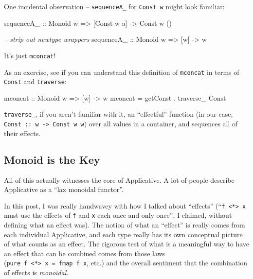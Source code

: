 \documentclass[]{article}
\newenvironment{Shaded}{}{}
\newcommand{\CommentTok}[1]{\textcolor[rgb]{0.38,0.63,0.69}{\textit{#1}}}
\newcommand{\DataTypeTok}[1]{\textcolor[rgb]{0.56,0.13,0.00}{#1}}
\newcommand{\FunctionTok}[1]{\textcolor[rgb]{0.02,0.16,0.49}{#1}}
\newcommand{\NormalTok}[1]{#1}
\newcommand{\OtherTok}[1]{\textcolor[rgb]{0.00,0.44,0.13}{#1}}
\begin{document}
One incidental observation -- \texttt{sequenceA\_} for \texttt{Const\ w} might
look familiar:

\begin{Shaded}
\begin{Highlighting}[]
\OtherTok{sequenceA_ ::} \DataTypeTok{Monoid}\NormalTok{ w }\OtherTok{=>}\NormalTok{ [}\DataTypeTok{Const}\NormalTok{ w a] }\OtherTok{->} \DataTypeTok{Const}\NormalTok{ w ()}

\CommentTok{-- strip out newtype wrappers}
\OtherTok{sequenceA_ ::} \DataTypeTok{Monoid}\NormalTok{ w }\OtherTok{=>}\NormalTok{ [w] }\OtherTok{->}\NormalTok{ w}
\end{Highlighting}
\end{Shaded}

It's just \texttt{mconcat}!

As an exercise, see if you can understand this definition of \texttt{mconcat} in
terms of \texttt{Const} and \texttt{traverse}:

\begin{Shaded}
\begin{Highlighting}[]
\NormalTok{mconcat}\OtherTok{ ::} \DataTypeTok{Monoid}\NormalTok{ w }\OtherTok{=>}\NormalTok{ [w] }\OtherTok{->}\NormalTok{ w}
\NormalTok{mconcat }\FunctionTok{=}\NormalTok{ getConst }\FunctionTok{.}\NormalTok{ traverse_ }\DataTypeTok{Const}
\end{Highlighting}
\end{Shaded}

\texttt{traverse\_}, if you aren't familiar with it, an ``effectful'' function
(in our case, \texttt{Const\ ::\ w\ -\textgreater{}\ Const\ w\ w}) over all
values in a container, and sequences all of their effects.

\hypertarget{monoid-is-the-key}{%
\subsection{Monoid is the Key}\label{monoid-is-the-key}}

All of this actually witnesses the core of Applicative. A lot of people describe
Applicative as a ``lax monoidal functor''.

In this post, I was really handwavey with how I talked about ``effects''
(``\texttt{f\ \textless{}*\textgreater{}\ x} must use the effects of \texttt{f}
and \texttt{x} each once and only once'', I claimed, without defining what an
effect was). The notion of what an ``effect'' is really comes from each
individual Applicative, and each type really has its own conceptual picture of
what counts as an effect. The rigorous test of what is a meaningful way to have
an effect that can be combined comes from those laws
(\texttt{pure\ f\ \textless{}*\textgreater{}\ x\ =\ fmap\ f\ x}, etc.) and the
overall sentiment that the combination of effects is \emph{monoidal}.
\end{document}
